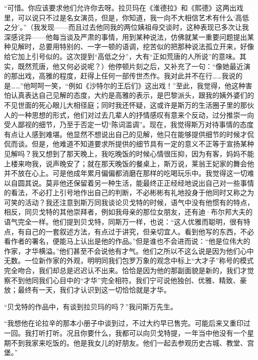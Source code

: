 \par “可惜。你应该要求他们允许你去呀。拉贝玛在《淮德拉》和《熙德》这两出戏里，可以说只不过是名女演员，但是，你知道，我一向不大相信艺术有什么‘高低之分’。”（我发现——而且过去他同我的两位姨祖母交谈时，这种表现已多次让我深感诧异——他每当谈及严肃的事情，用到某种说法，仿佛就某一重要问题提出某种见解时，总要用特别的、一字一顿的语调，挖苦似的把那种说法孤立开来，好像给它加上引号似的。这次提到“高低之分”，大有“正如荒唐的人所说”的意味。其实，既然荒唐，他又何必说呢？）他停顿片刻之后，又补充了一句：“像她最近演的那出戏，高雅的程度，赶得上任何一部传世杰作。我对此并不在行……我说的是……”他呵呵一笑，“例如《沙特尔的王后们》这出戏！”至此，我觉得，他这种害怕认真表达自己见解的态度，大约是高雅的表示，是巴黎派头，跟我的姨外婆们的不见世面的死心眼儿大相径庭；同时我还怀疑，这或许是斯万的生活圈子里的那伙人的一种思想的形式，他们对过去几辈人的抒情感叹有意来个反动，过分推崇一向受人鄙视的细节，乃至于否定一切“陈词滥调”。现在，我觉得斯万对待事情的态度有点让人感到难堪。他显然不想说出自己的见解，他只在能够提供细节的时候才侃侃而谈。但是，他难道不知道要求所提供的细节具有一定的意义不正等于宣扬某种见解吗？我又想到了那天晚上，我吃晚饭的时候心情很压抑，因为有客，妈妈不能上楼来吻我，说声晚安了；就在那天晚饭的餐桌上，斯万说，莱翁王妃家的舞会他并不放在心上。可是他成年累月偏偏都消磨在那样的吃喝玩乐中。我觉得这一切难以自圆其说。莫非他还保留着另一种生活，能最终正正经经地说出自己对一些事情的看法，不必打上引号地作出自己的判断，不必彬彬有礼地投身于他同时又称之为可笑的活动？我还注意到斯万同我谈论贝戈特的时候，语气中没有他惯有的特点，相反，同贝戈特的其他崇拜者，例如我母亲的那位女朋友，还有迪·布尔邦大夫的语气完全一样。他们提到贝戈特，同斯万一样，也说：“这人优雅而聪明，很有特点，有自己的一套叙述方法，有点过于讲究，但亲切宜人。看到他写的东西，不必看作者的署名，便能马上认出是他的作品。”但是谁也不会进而说：“他是位伟大的作家，才华横溢。”他们甚至不会说他有才气。他们之所以不这么说是因为他们心中无数。一位新作家的外观，明明同我们包罗万象的观念中标上“大才子”称号的模式完全吻合，我们却总是迟迟认不出来。恰恰是因为他的那副面貌是新的，我们才觉察不到他同我们心目中的“才华”完全相符。我们宁可说他独创、优雅、精致、豪放；最终有一天，我们才认识到这一切恰恰就是才华。
\par “贝戈特的作品中，有谈到拉贝玛的吗？”我问斯万先生。
\par “我想他在论拉辛的那本小册子中谈到过，不过大约早已售完。可能后来又重印过一回。我打听打听。况且你要什么，我都可以向贝戈特提，一年当中他没有一个星期不到我家来吃饭的。他是我女儿的好朋友。他们一起去参观历史古城、教堂、宫堡。”











